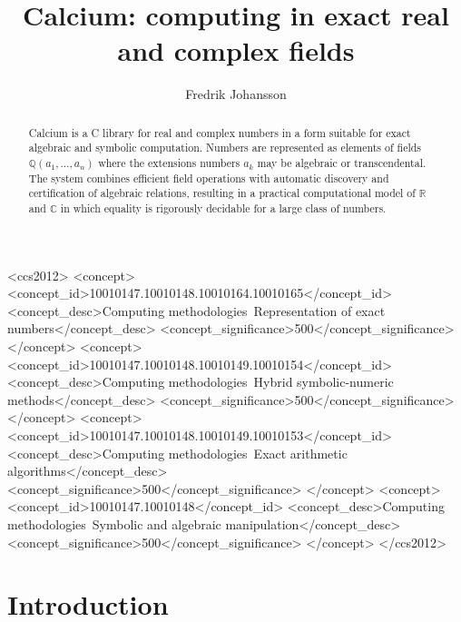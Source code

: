 \documentclass[sigconf,screen,urlbreakonhyphens]{acmart}
\title{Calcium: computing in exact real and complex fields}
\date{}
\author{Fredrik Johansson}
\affiliation{%
  \institution{Inria Bordeaux and Institut Math. Bordeaux}
  \city{33400 Talence}
  \country{France}
}
\begin{document}
\begin{abstract}
Calcium is a C library for real and complex numbers
in a form suitable for exact algebraic and symbolic computation.
Numbers are represented as elements of
fields $\mathbb{Q}(a_1,\ldots,a_n)$ where
the extensions numbers
$a_k$ may be algebraic or transcendental.
The system combines efficient field operations
with automatic discovery and certification of algebraic relations,
resulting in a practical computational model of $\mathbb{R}$ and $\mathbb{C}$
in which equality is rigorously decidable for a large class of numbers.
\end{abstract}

\begin{CCSXML}
<ccs2012>
   <concept>
       <concept_id>10010147.10010148.10010164.10010165</concept_id>
       <concept_desc>Computing methodologies~Representation of exact numbers</concept_desc>
       <concept_significance>500</concept_significance>
       </concept>
   <concept>
       <concept_id>10010147.10010148.10010149.10010154</concept_id>
       <concept_desc>Computing methodologies~Hybrid symbolic-numeric methods</concept_desc>
       <concept_significance>500</concept_significance>
       </concept>
   <concept>
       <concept_id>10010147.10010148.10010149.10010153</concept_id>
       <concept_desc>Computing methodologies~Exact arithmetic algorithms</concept_desc>
       <concept_significance>500</concept_significance>
       </concept>
   <concept>
       <concept_id>10010147.10010148</concept_id>
       <concept_desc>Computing methodologies~Symbolic and algebraic manipulation</concept_desc>
       <concept_significance>500</concept_significance>
       </concept>
 </ccs2012>
\end{CCSXML}



\maketitle

\section{Introduction}
\end{document}
